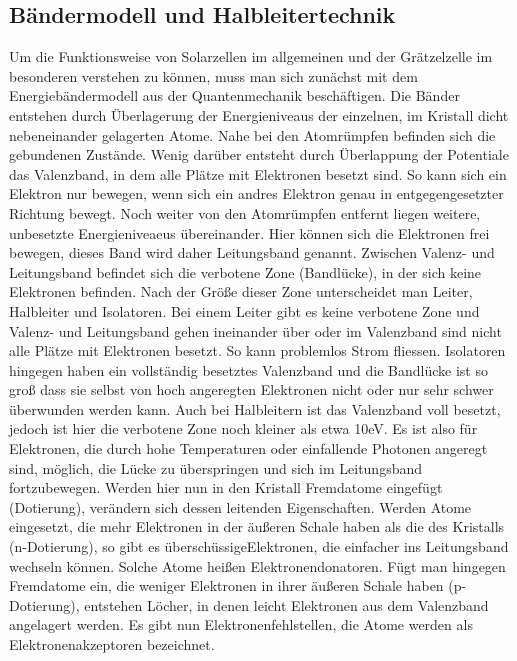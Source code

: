 \documentclass[11pt]{scrartcl}
\begin{document}
\subsection{B\"andermodell und Halbleitertechnik}
Um die Funktionsweise von Solarzellen im allgemeinen und der Gr\"atzelzelle im besonderen verstehen zu k\"onnen, muss man sich zun\"achst mit dem Energieb\"andermodell aus der Quantenmechanik besch\"aftigen. Die B\"ander entstehen durch \"Uberlagerung der Energieniveaus der einzelnen, im Kristall dicht nebeneinander gelagerten Atome. Nahe bei den Atomr\"umpfen befinden sich die gebundenen Zust\"ande. Wenig dar\"uber entsteht durch \"Uberlappung der Potentiale das Valenzband, in dem alle Pl\"atze mit Elektronen besetzt sind. So kann sich ein Elektron nur bewegen, wenn sich ein andres Elektron genau in entgegengesetzter Richtung bewegt. 
Noch weiter von den Atomr\"umpfen entfernt liegen weitere, unbesetzte Energieniveaeus \"ubereinander. Hier k\"onnen sich die Elektronen frei bewegen, dieses Band wird daher Leitungsband genannt.\newline
Zwischen Valenz- und Leitungsband befindet sich die verbotene Zone (Bandl\"ucke), in der sich keine Elektronen befinden. Nach der Gr\"o\ss{}e dieser Zone unterscheidet man Leiter, Halbleiter und Isolatoren. Bei einem Leiter gibt es keine verbotene Zone und Valenz- und Leitungsband gehen ineinander \"uber oder im Valenzband sind nicht alle Pl\"atze mit Elektronen besetzt. So kann problemlos Strom fliessen. Isolatoren hingegen haben ein vollst\"andig besetztes Valenzband und die Bandl\"ucke ist so gro\ss{} dass sie selbst von hoch angeregten Elektronen nicht oder nur sehr schwer \"uberwunden werden kann.\newline
Auch bei Halbleitern ist das Valenzband voll besetzt, jedoch ist hier die verbotene Zone noch kleiner als etwa 10eV. Es ist also f\"ur Elektronen, die durch hohe Temperaturen oder einfallende Photonen angeregt sind, m\"oglich, die L\"ucke zu \"uberspringen und sich im Leitungsband fortzubewegen. Werden hier nun in den Kristall Fremdatome eingef\"ugt (Dotierung), ver\"andern sich dessen leitenden Eigenschaften. Werden Atome eingesetzt, die mehr Elektronen in der \"au\ss{}eren Schale haben als die des Kristalls (n-Dotierung), so gibt es \glqq\"ubersch\"ussige\grqq Elektronen, die einfacher ins Leitungsband wechseln k\"onnen. Solche Atome hei\ss{}en Elektronendonatoren. F\"ugt man hingegen Fremdatome ein, die weniger Elektronen in ihrer \"au\ss{}eren Schale haben (p-Dotierung), entstehen L\"ocher, in denen leicht Elektronen aus dem Valenzband angelagert werden. Es gibt nun Elektronenfehlstellen, die Atome werden als Elektronenakzeptoren bezeichnet.\newline
\end{document}
